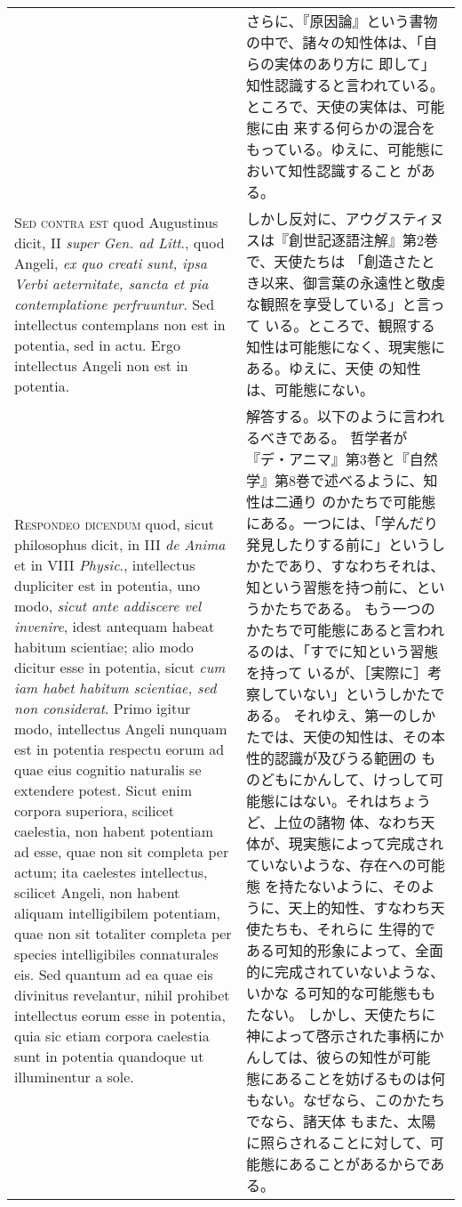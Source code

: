 \documentclass[10pt]{jsarticle} %
\begin{document}
\begin{longtable}{p{21em}p{21em}}
&


さらに、『原因論』という書物の中で、諸々の知性体は、「自らの実体のあり方に
 即して」知性認識すると言われている。ところで、天使の実体は、可能態に由
 来する何らかの混合をもっている。ゆえに、可能態において知性認識すること
 がある。

\\


{\scshape Sed contra est} quod Augustinus dicit, II
{\itshape super Gen. ad Litt}., quod Angeli, {\itshape ex quo creati sunt, ipsa Verbi
aeternitate, sancta et pia contemplatione perfruuntur}. Sed intellectus
contemplans non est in potentia, sed in actu. Ergo intellectus Angeli
non est in potentia.


&

しかし反対に、アウグスティヌスは『創世記逐語注解』第2巻で、天使たちは
 「創造さたとき以来、御言葉の永遠性と敬虔な観照を享受している」と言って
 いる。ところで、観照する知性は可能態になく、現実態にある。ゆえに、天使
 の知性は、可能態にない。


\\


{\scshape Respondeo dicendum} quod, sicut philosophus
dicit, in III {\itshape de Anima} et in VIII {\itshape Physic}., intellectus dupliciter est in
potentia, uno modo, {\itshape sicut ante addiscere vel invenire}, idest antequam
habeat habitum scientiae; alio modo dicitur esse in potentia, sicut {\itshape cum
iam habet habitum scientiae, sed non considerat}. Primo igitur modo,
intellectus Angeli nunquam est in potentia respectu eorum ad quae eius
cognitio naturalis se extendere potest. Sicut enim corpora superiora,
scilicet caelestia, non habent potentiam ad esse, quae non sit completa
per actum; ita caelestes intellectus, scilicet Angeli, non habent
aliquam intelligibilem potentiam, quae non sit totaliter completa per
species intelligibiles connaturales eis. 
Sed quantum ad ea quae eis
divinitus revelantur, nihil prohibet intellectus eorum esse in potentia,
quia sic etiam corpora caelestia sunt in potentia quandoque ut
illuminentur a sole.
&

解答する。以下のように言われるべきである。
哲学者が『デ・アニマ』第3巻と『自然学』第8巻で述べるように、知性は二通り
 のかたちで可能態にある。一つには、「学んだり発見したりする前に」というし
 かたであり、すなわちそれは、知という習態を持つ前に、というかたちである。
もう一つのかたちで可能態にあると言われるのは、「すでに知という習態を持って
 いるが、［実際に］考察していない」というしかたである。
それゆえ、第一のしかたでは、天使の知性は、その本性的認識が及びうる範囲の
 ものどもにかんして、けっして可能態にはない。それはちょうど、上位の諸物
 体、なわち天体が、現実態によって完成されていないような、存在への可能態
 を持たないように、そのように、天上的知性、すなわち天使たちも、それらに
 生得的である可知的形象によって、全面的に完成されていないような、いかな
 る可知的な可能態ももたない。
しかし、天使たちに神によって啓示された事柄にかんしては、彼らの知性が可能
 態にあることを妨げるものは何もない。なぜなら、このかたちでなら、諸天体
 もまた、太陽に照らされることに対して、可能態にあることがあるからである。




\end{longtable}
\end{document}
